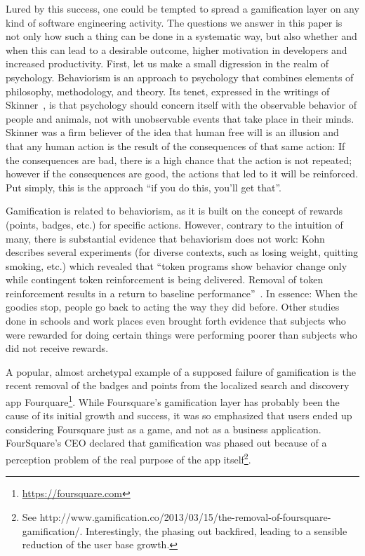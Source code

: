 Lured by this success, one could be tempted to spread a gamification layer on any kind of software engineering activity. The questions we answer in this paper is not only how such a thing can be done in a systematic way, but also whether and when this can lead to a desirable outcome, \ie higher motivation in developers and increased productivity. First, let us make a small digression in the realm of psychology. Behaviorism is an approach to psychology that combines elements of philosophy, methodology, and theory. Its tenet, expressed in the writings of Skinner~\cite{Skin1978a}, is that psychology should concern itself with the observable behavior of people and animals, not with unobservable events that take place in their minds. Skinner was a firm believer of the idea that human free will is an illusion and that any human action is the result of the consequences of that same action: If the consequences are bad, there is a high chance that the action is not repeated; however if the consequences are good, the actions that led to it will be reinforced. Put simply, this is the approach ``if you do this, you'll get that''. 

Gamification is related to behaviorism, as it is built on the concept of rewards (points, badges, etc.) for specific actions. However, contrary to the intuition of many, there is substantial evidence that behaviorism does not work: Kohn describes several experiments (for diverse contexts, such as losing weight, quitting smoking, etc.) which revealed that ``token programs show behavior change only while contingent token reinforcement is being delivered. Removal of token reinforcement results in a return to baseline performance''~\cite{Kohn1993a}. In essence: When the goodies stop, people go back to acting the way they did before. Other studies done in schools and work places even brought forth evidence that subjects who were rewarded for doing certain things were performing poorer than subjects who did not receive rewards.

A popular, almost archetypal example of a supposed failure of gamification is the recent removal of the badges and points from the localized search and discovery app Fourquare\footnote{\url{https://foursquare.com}}. While Foursquare's gamification layer has probably been the cause of its initial growth and success, it was so emphasized that users ended up considering Foursquare just as a game, and not as a business application. FourSquare's CEO declared that gamification was phased out because of a perception problem of the real purpose of the app itself\footnote{See http://www.gamification.co/2013/03/15/the-removal-of-foursquare-gamification/. Interestingly, the phasing out backfired, leading to a sensible reduction of the user base growth.}. 

